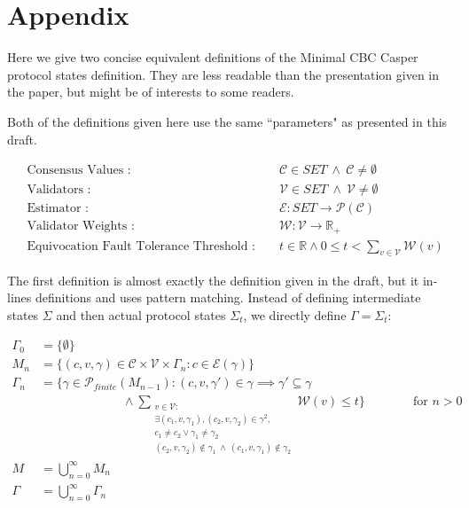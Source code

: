 \section{Appendix}

Here we give two concise equivalent definitions of the Minimal CBC Casper protocol states definition. They are less readable than the presentation given in the paper, but might be of interests to some readers.

Both of the definitions given here use the same ``parameters" as presented in this draft.

\begin{align}
&\text{Consensus Values :   } && \mathcal{C} \in SET ~ \land ~ \mathcal{C} \neq \emptyset \\ 
&\text{Validators :   } && \mathcal{V} \in SET ~ \land ~ \mathcal{V} \neq \emptyset\\
&\text{Estimator :   } &&\mathcal{E}: SET \to \mathcal{P}(\mathcal{C}) \\
&\text{Validator Weights :   } &&\mathcal{W}: \mathcal{V} \to \mathbb{R}_+ \\
&\text{Equivocation Fault Tolerance Threshold :   } && t \in \mathbb{R} \land 0 \leq t < \sum_{v \in \mathcal{V}} \mathcal{W}(v)
\end{align}

The first definition is almost exactly the definition given in the draft, but it in-lines definitions and uses pattern matching. Instead of defining intermediate states $\Sigma$ and then actual protocol states $\Sigma_t$, we directly define $\Gamma = \Sigma_t$:

\begin{align}
\Gamma_0 &= \{\emptyset\} \\
M_n &= \{ (c, v, \gamma) \in \mathcal{C} \times \mathcal{V} \times \Gamma_{n} : c \in \mathcal{E}(\gamma) \} \\
\Gamma_n &= \{ \gamma \in \mathcal{P}_{finite}(M_{n-1}) : (c, v, \gamma') \in \gamma \implies \gamma' \subseteq \gamma \\
&~~~~~~~~~~~~~~~~~~~~~~~~~~~~~~\land \sum_{ \substack{v \in \mathcal{V} :  \\ \exists (c_1 , v, \gamma_1), (c_2 , v, \gamma_2) \in \gamma^2, \\ c_1 \neq c_2 \lor \gamma_1 \neq \gamma_2 \\  (c_2 , v, \gamma_2) \notin \gamma_1 ~\land ~ (c_1 , v, \gamma_1) \notin \gamma_2}} \mathcal{W}(v) \leq t \}  ~~~~~~~~~~~~~~~~\text{ for $n > 0$}  \\
M &= \bigcup_{n = 0}^\infty M_n \\
\Gamma &= \bigcup_{n = 0}^\infty \Gamma_n  \\
\end{align}

